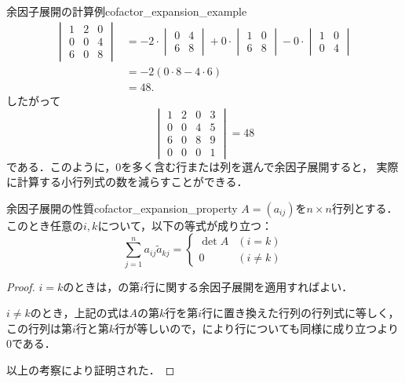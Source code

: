 \begin{example}{余因子展開の計算例}{cofactor_expansion_example}
\begin{align*}
  \begin{vmatrix}
    1 & 2 & 0 \\
    0 & 0 & 4 \\
    6 & 0 & 8
  \end{vmatrix}
  &=
  -2 \cdot
  \begin{vmatrix}
    0 & 4 \\
    6 & 8
  \end{vmatrix}
  +0 \cdot
  \begin{vmatrix}
    1 & 0 \\
    6 & 8
  \end{vmatrix}
  -0 \cdot
  \begin{vmatrix}
    1 & 0 \\
    0 & 4
  \end{vmatrix} \\
  &=
  -2(0 \cdot 8 - 4 \cdot 6) \\
  &= 48.
  \end{align*}
  したがって
  \[
  \begin{vmatrix}
    1 & 2 & 0 & 3 \\
    0 & 0 & 4 & 5 \\
    6 & 0 & 8 & 9 \\
    0 & 0 & 0 & 1
  \end{vmatrix}
  =48
  \]
  である．このように，$0$を多く含む行または列を選んで余因子展開すると，
  実際に計算する小行列式の数を減らすことができる．
\end{example}

\begin{prop}{余因子展開の性質}{cofactor_expansion_property}
  $A = (a_{ij})$を$n \times n$行列とする．このとき任意の$i,k$について，以下の等式が成り立つ：
  \[
  \sum_{j=1}^{n} a_{ij} \tilde{a}_{kj} = \begin{cases} \det A & (i=k) \\ 0 & (i \ne k) \end{cases}
  \]
\end{prop}

\begin{leftbar}
\begin{proof}
  $i=k$のときは，の第$i$行に関する余因子展開を適用すればよい．

$i \ne k$のとき，上記の式は$A$の第$k$行を第$i$行に置き換えた行列の行列式に等しく，この行列は第$i$行と第$k$行が等しいので，により行についても同様に成り立つより$0$である．

  以上の考察により証明された．
\end{proof}
\end{leftbar}


